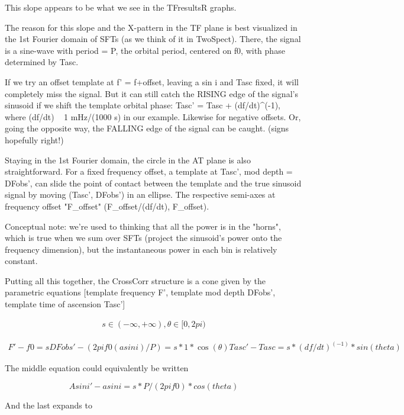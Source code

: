 \documentclass{article}
\begin{document}
This slope appears to be what we see in the TFresultsR graphs.

The reason for this slope and the X-pattern in the TF plane is best
visualized in the 1st Fourier domain of SFTs (as we think of it in
TwoSpect). There, the signal is a sine-wave with period = P, the orbital
period, centered on f0, with phase determined by Tasc.

If we try an offset template at f' = f+offset, leaving a sin i and Tasc
fixed, it will completely miss the signal. But it can still catch the
RISING edge of the signal's sinusoid if we shift the template orbital
phase: Tasc' = Tasc + (df/dt)^(-1), where (df/dt) ~ 1 mHz/(1000 s) in
our example. Likewise for negative offsets. Or, going the opposite way,
the FALLING edge of the signal can be caught. (signs hopefully right!)

Staying in the 1st Fourier domain, the circle in the AT plane is also
straightforward. For a fixed frequency offset, a template at Tasc', mod
depth = DFobs', can slide the point of contact between the template and
the true sinusoid signal by moving (Tasc', DFobs') in an ellipse. The
respective semi-axes at frequency offset "F_offset" (F_offset/(df/dt),
F_offset).

Conceptual note: we're used to thinking that all the power is in the
"horns", which is true when we sum over SFTs (project the sinusoid's
power onto the frequency dimension), but the instantaneous power in each
bin is relatively constant.

Putting all this together, the CrossCorr structure is a cone given by
the parametric equations [template frequency F', template mod depth
DFobs', template time of ascension Tasc']

\begin{eqnarray}
s \in (-\infty, +\infty), \theta \in [0, 2 pi)
\end{eqnarray}

\begin{eqnarray}
F' - f0                        = s
DFobs' - (2 pi f0 (a sin i)/P) = s * 1 * \cos(\theta)
Tasc' - Tasc                   = s * (df/dt)^(-1) * sin(theta)
\end{eqnarray}

The middle equation could equivalently be written

\begin{equation}
Asini' - a sin i = s * P/(2 pi f0) * cos(theta)
\end{equation}

And the last expands to
\end{document}
